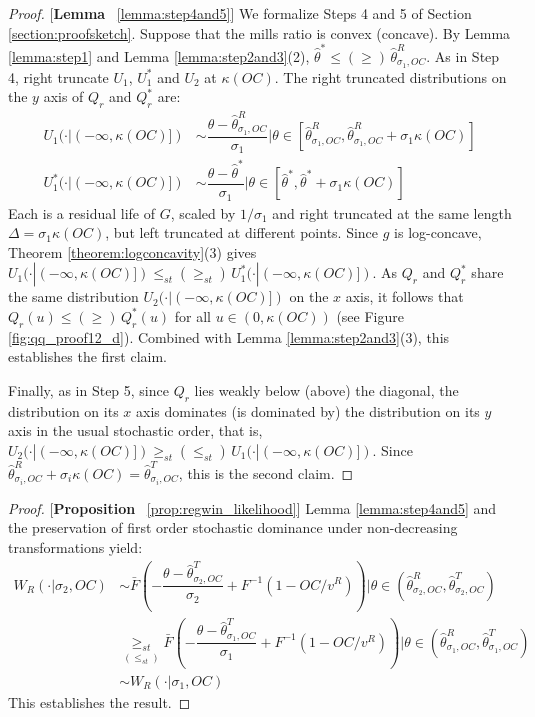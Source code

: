 \begin{proof}{[\textbf{Lemma} ~\ref{lemma:step4and5}]} We formalize Steps 4 and 5 of Section \ref{section:proofsketch}. Suppose that the mills ratio is convex (concave). By Lemma \ref{lemma:step1} and Lemma \ref{lemma:step2and3}(2), $\hat{\theta}^*\leq(\geq)\,\hat{\theta}^R_{\sigma_1,OC}$. As in Step 4, right truncate $U_1$, $U^*_1$ and $U_2$ at $\kappa(OC)$. The right truncated distributions on the $y$ axis of $Q_r$ and $Q^*_r$ are:
\begin{align*}
    U_1(\cdot|(-\infty,\kappa(OC)]) &\sim \dfrac{\theta-\hat{\theta}^R_{\sigma_1,OC}}{\sigma_1}|\theta\in[\hat{\theta}^R_{\sigma_1,OC},\hat{\theta}^R_{\sigma_1,OC}+\sigma_1\kappa(OC)] \\
    U^*_1(\cdot|(-\infty,\kappa(OC)]) &\sim \dfrac{\theta-\hat{\theta}^*}{\sigma_1}|\theta\in[\hat{\theta}^*,\hat{\theta}^*+\sigma_1\kappa(OC)]
\end{align*}
Each is a residual life of $G$, scaled by $1/\sigma_1$ and right truncated at the same length $\Delta=\sigma_1\kappa(OC)$, but left truncated at different points. Since $g$ is log-concave, Theorem \ref{theorem:logconcavity}(3) gives $U_1(\cdot|(-\infty,\kappa(OC)])\leq_{st}(\geq_{st})\,U^*_1(\cdot|(-\infty,\kappa(OC)])$. As $Q_r$ and $Q^*_r$ share the same distribution $U_2(\cdot|(-\infty,\kappa(OC)])$ on the $x$ axis, it follows that $Q_r(u)\leq(\geq)\,Q^*_r(u)$ for all $u\in(0,\kappa(OC))$ (see Figure \ref{fig:qq_proof12_d}). Combined with Lemma \ref{lemma:step2and3}(3), this establishes the first claim.

\noindent Finally, as in Step 5, since $Q_r$ lies weakly below (above) the diagonal, the distribution on its $x$ axis dominates (is dominated by) the distribution on its $y$ axis in the usual stochastic order, that is, $U_2(\cdot|(-\infty,\kappa(OC)])\geq_{st}(\leq_{st})\,U_1(\cdot|(-\infty,\kappa(OC)])$. Since $\hat{\theta}^R_{\sigma_i,OC}+\sigma_i\kappa(OC)=\hat{\theta}^T_{\sigma_i,OC}$, this is the second claim.
\end{proof}

\begin{proof}{[\textbf{Proposition} ~\ref{prop:regwin_likelihood}]} Lemma \ref{lemma:step4and5} and the preservation of first order stochastic dominance under non-decreasing transformations yield:
\begin{align*}
  W_R(\cdot|\sigma_2,OC) &\sim \bar{F}\left(-\dfrac{\theta - \hat{\theta}^T_{\sigma_2,OC}}{\sigma_2} + F^{-1}(1-OC/v^R)\right)|\theta\in (\hat{\theta}^R_{\sigma_2,OC}, \hat{\theta}^T_{\sigma_2,OC})\\ 
  &\underset{(\leq_{st})}{\geq_{st}} \bar{F}\left(-\dfrac{\theta - \hat{\theta}^T_{\sigma_1,OC}}{\sigma_1}+F^{-1}(1-OC/v^R)\right)|\theta\in (\hat{\theta}^R_{\sigma_1,OC}, \hat{\theta}^T_{\sigma_1,OC}) \\
  &\sim W_R(\cdot|\sigma_1,OC)
\end{align*}
This establishes the result. 
\end{proof}

